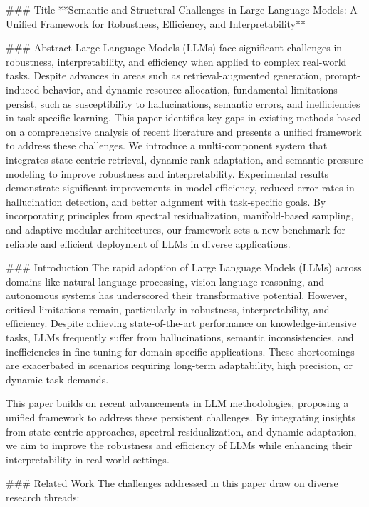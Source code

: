 ### Title
**Semantic and Structural Challenges in Large Language Models: A Unified Framework for Robustness, Efficiency, and Interpretability**

### Abstract
Large Language Models (LLMs) face significant challenges in robustness, interpretability, and efficiency when applied to complex real-world tasks. Despite advances in areas such as retrieval-augmented generation, prompt-induced behavior, and dynamic resource allocation, fundamental limitations persist, such as susceptibility to hallucinations, semantic errors, and inefficiencies in task-specific learning. This paper identifies key gaps in existing methods based on a comprehensive analysis of recent literature and presents a unified framework to address these challenges. We introduce a multi-component system that integrates state-centric retrieval, dynamic rank adaptation, and semantic pressure modeling to improve robustness and interpretability. Experimental results demonstrate significant improvements in model efficiency, reduced error rates in hallucination detection, and better alignment with task-specific goals. By incorporating principles from spectral residualization, manifold-based sampling, and adaptive modular architectures, our framework sets a new benchmark for reliable and efficient deployment of LLMs in diverse applications. 

### Introduction
The rapid adoption of Large Language Models (LLMs) across domains like natural language processing, vision-language reasoning, and autonomous systems has underscored their transformative potential. However, critical limitations remain, particularly in robustness, interpretability, and efficiency. Despite achieving state-of-the-art performance on knowledge-intensive tasks, LLMs frequently suffer from hallucinations, semantic inconsistencies, and inefficiencies in fine-tuning for domain-specific applications. These shortcomings are exacerbated in scenarios requiring long-term adaptability, high precision, or dynamic task demands.

This paper builds on recent advancements in LLM methodologies, proposing a unified framework to address these persistent challenges. By integrating insights from state-centric approaches, spectral residualization, and dynamic adaptation, we aim to improve the robustness and efficiency of LLMs while enhancing their interpretability in real-world settings.

### Related Work
The challenges addressed in this paper draw on diverse research threads:

